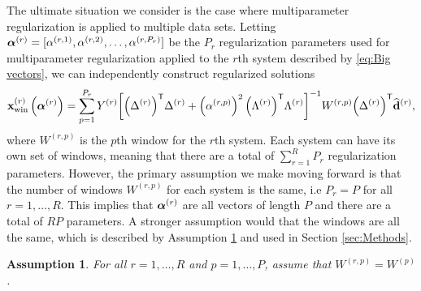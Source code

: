 \documentclass[12pt]{article}
\newtheorem{assumption}{Assumption}
\begin{document}
The ultimate situation we consider is the case where multiparameter regularization is applied to multiple data sets. Letting $\bm{\alpha}^{(r)} = [\alpha^{(r,1)},\alpha^{(r,2)},\ldots,\alpha^{(r,P_r)}]$ be the $P_r$ regularization parameters used for multiparameter regularization applied to the $r$th system described by \eqref{eq:Big vectors}, we can independently construct regularized solutions
\[\mathbf{x}_{\text{win}}^{(r)}\left(\bm{\alpha}^{(r)}\right) = \sum_{p=1}^{P_r} Y^{(r)}{\left[{\left(\Delta^{(r)}\right)}^\mathsf{T}\Delta^{(r)} + \left(\alpha^{(r,p)}\right)^2 {\left(\Lambda^{(r)}\right)}^\mathsf{T}\Lambda^{(r)}\right]}^{-1}W^{(r,p)}{\left(\Delta^{(r)}\right)}^\mathsf{T}\widehat{\mathbf{d}}^{(r)},\]
where $W^{(r,p)}$ is the $p$th window for the $r$th system. Each system can have its own set of windows, meaning that there are a total of $\sum_{r=1}^{R} P_r$ regularization parameters. However, the primary assumption we make moving forward is that the number of windows $W^{(r,p)}$ for each system is the same, i.e $P_r = P$ for all $r = 1,\ldots,R$. This implies that $\bm{\alpha}^{(r)}$ are all vectors of length $P$ and there are a total of $RP$ parameters. A stronger assumption would that the windows are all the same, which is described by Assumption \ref{Assumption_Windows} and used in Section \ref{sec:Methods}.

\begin{assumption}
\label{Assumption_Windows}
For all $r = 1,\ldots,R$ and $p = 1,\ldots,P$, assume that $W^{(r,p)} = W^{(p)}$.
\end{assumption}
\end{document}
